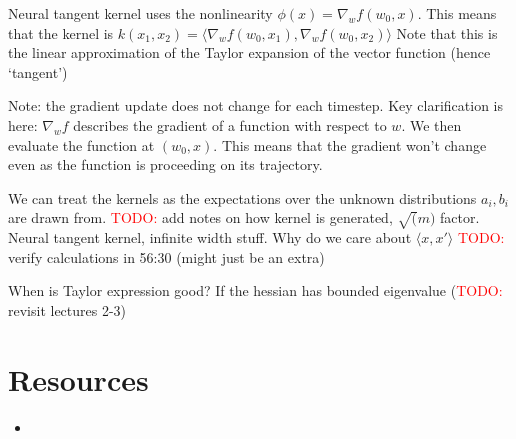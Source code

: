 \documentclass[answers,12pt]{exam}
\newcommand{\TODO}{\textcolor{red}{TODO:}}
\begin{document}
Neural tangent kernel uses the nonlinearity $\phi(x) = \nabla_w f(w_0,x)$.
This means that the kernel is $k(x_1,x_2) = \langle \nabla_w f(w_0,x_1), \nabla_w f(w_0,x_2) \rangle$
Note that this is the linear approximation of the Taylor expansion of the vector function (hence `tangent')

Note: the gradient update does not change for each timestep.
Key clarification is here: $\nabla_w f$ describes the gradient of a function with respect to $w$.
We then evaluate the function at $(w_0,x)$.
This means that the gradient won't change even as the function is proceeding on its trajectory.

We can treat the kernels as the expectations over the unknown distributions $a_i, b_i$ are drawn from.
\TODO{} add notes on how kernel is generated, $\sqrt(m)$ factor.
Neural tangent kernel, infinite width stuff. 
Why do we care about $\langle x,x' \rangle$
\TODO{} verify calculations in 56:30 (might just be an extra)

When is Taylor expression good?
If the hessian has bounded eigenvalue (\TODO{} revisit lectures 2-3)

\section{Resources}
\begin{itemize}
    \item 
\end{itemize}
\end{document}
